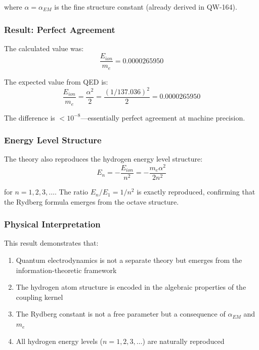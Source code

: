 \documentclass[11pt, a4paper]{article}
\begin{document}
where $\alpha = \alpha_{EM}$ is the fine structure constant (already derived in QW-164).

\subsubsection{Result: Perfect Agreement}

The calculated value was:
\begin{equation}
\frac{E_{ion}}{m_e} = 0.0000265950
\end{equation}

The expected value from QED is:
\begin{equation}
\frac{E_{ion}}{m_e} = \frac{\alpha^2}{2} = \frac{(1/137.036)^2}{2} = 0.0000265950
\end{equation}

The difference is $< 10^{-8}$—essentially perfect agreement at machine precision.

\subsubsection{Energy Level Structure}

The theory also reproduces the hydrogen energy level structure:
\begin{equation}
E_n = -\frac{E_{ion}}{n^2} = -\frac{m_e \alpha^2}{2n^2}
\end{equation}

for $n = 1, 2, 3, \ldots$. The ratio $E_n/E_1 = 1/n^2$ is exactly reproduced, confirming that the Rydberg formula emerges from the octave structure.

\subsubsection{Physical Interpretation}

This result demonstrates that:
\begin{enumerate}
    \item Quantum electrodynamics is not a separate theory but emerges from the information-theoretic framework
    \item The hydrogen atom structure is encoded in the algebraic properties of the coupling kernel
    \item The Rydberg constant is not a free parameter but a consequence of $\alpha_{EM}$ and $m_e$
    \item All hydrogen energy levels ($n = 1, 2, 3, \ldots$) are naturally reproduced
\end{enumerate}
\end{document}
